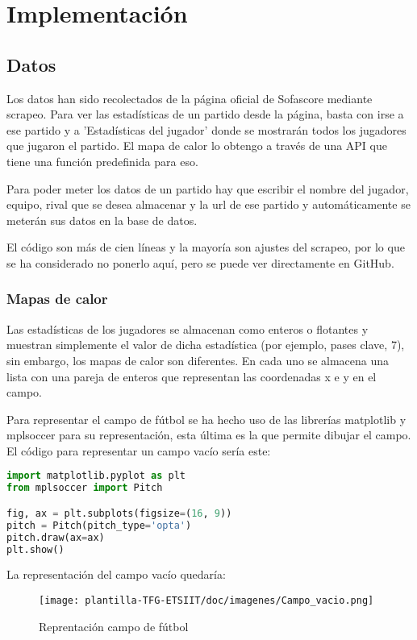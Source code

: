 \chapter{Implementación}

\section{Datos}
Los datos han sido recolectados de la página oficial de Sofascore \cite{Sofascore} mediante scrapeo. Para ver las estadísticas de un partido desde la página, basta con irse a ese partido y a 'Estadísticas del jugador' donde se mostrarán todos los jugadores que jugaron el partido. El mapa de calor lo obtengo a través de una API que tiene una función predefinida para eso. 

Para poder meter los datos de un partido hay que escribir el nombre del jugador, equipo, rival que se desea almacenar y la url de ese partido y automáticamente se meterán sus datos en la base de datos.

El código son más de cien líneas y la mayoría son ajustes del scrapeo, por lo que se ha considerado no ponerlo aquí, pero se puede ver directamente en GitHub.

\subsection{Mapas de calor}
Las estadísticas de los jugadores se almacenan como enteros o flotantes y muestran simplemente el valor de dicha estadística (por ejemplo, pases clave, 7), sin embargo, los mapas de calor son diferentes. En cada uno se almacena una lista con una pareja de enteros que representan las coordenadas x e y en el campo. 

Para representar el campo de fútbol se ha hecho uso de las librerías matplotlib y mplsoccer para su representación, esta última es la que permite dibujar el campo. El código para representar un campo vacío sería este:

\begin{lstlisting}[language=Python, caption={Representación campo vacío}, label={lst:codigo-python}]
import matplotlib.pyplot as plt
from mplsoccer import Pitch

fig, ax = plt.subplots(figsize=(16, 9))
pitch = Pitch(pitch_type='opta')
pitch.draw(ax=ax)
plt.show()
\end{lstlisting}

La representación del campo vacío quedaría:

\begin{figure}[H]
    \centering
    \texttt{[image: plantilla-TFG-ETSIIT/doc/imagenes/Campo\_vacio.png]}
    \caption{Reprentación campo de fútbol}
    \label{fig:etiqueta-imagen}
\end{figure}


